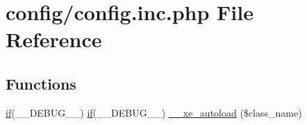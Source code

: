 \hypertarget{config_8inc_8php}{\section{config/config.inc.\-php File Reference}
\label{config_8inc_8php}
}
\subsection*{Functions}
\begin{DoxyCompactItemize}
\item 
\hyperlink{config_8inc_8php_a95d67dac5da3e46d0b07e9ad1647d08a}{if}(\-\_\-\-\_\-\-D\-E\-B\-U\-G\-\_\-\-\_\-) \hyperlink{config_8inc_8php_a95d67dac5da3e46d0b07e9ad1647d08a}{if}(\-\_\-\-\_\-\-D\-E\-B\-U\-G\-\_\-\-\_\-) \hyperlink{config_8inc_8php_aaedb2cb21b9e698e69dd7f8ef06618f2}{\-\_\-\-\_\-xe\-\_\-autoload} (\$class\-\_\-name)
\end{DoxyCompactItemize}
